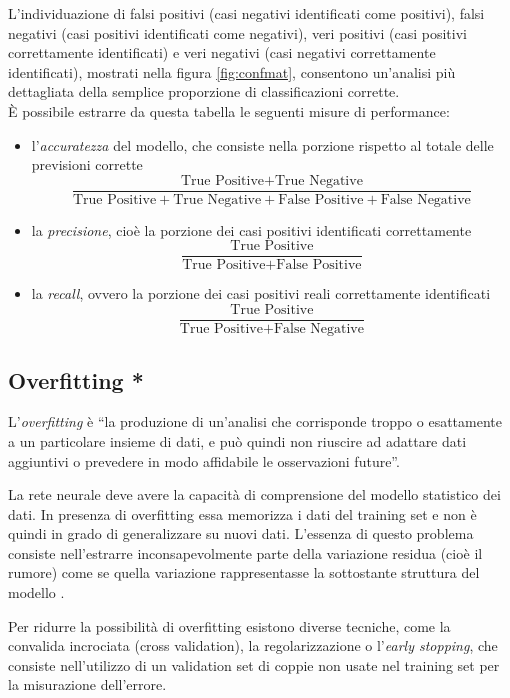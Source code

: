 L'individuazione di falsi positivi (casi negativi identificati come positivi), falsi negativi (casi positivi identificati come negativi), veri positivi (casi positivi correttamente identificati) e veri negativi (casi negativi correttamente identificati), mostrati nella figura \ref{fig:confmat}, consentono  un'analisi più dettagliata della semplice proporzione di classificazioni corrette. \\
È possibile estrarre da questa tabella le seguenti misure di performance:
\begin{itemize}
	\item l'\emph{accuratezza} del modello, che consiste nella porzione rispetto al totale delle previsioni corrette
	\begin{equation}
		\frac{\mbox{True Positive} + \mbox{True Negative}}{\mbox{True Positive} + \mbox{True Negative} + \mbox{False Positive} + \mbox{False Negative}}
	\end{equation} 
	\item la \emph{precisione}, cioè la porzione dei casi positivi identificati correttamente
		\begin{equation}
	\frac{\mbox{True Positive}}{\mbox{True Positive} + \mbox{False Positive}}
	\end{equation}
	
	\item la \emph{recall}, ovvero la porzione dei casi positivi reali correttamente identificati
		\begin{equation}
	\frac{\mbox{True Positive}}{\mbox{True Positive} + \mbox{False Negative}}
	\end{equation}
\end{itemize}


\subsection{Overfitting *}
\label{subsec:overfitting}

L'\emph{overfitting} è ``la produzione di un'analisi che corrisponde troppo o esattamente a un particolare insieme di dati, e può quindi non riuscire ad adattare dati aggiuntivi o prevedere in modo affidabile le osservazioni future''.

La rete neurale deve avere la capacità di comprensione del modello statistico dei dati. In presenza di overfitting essa memorizza i dati del training set e non è quindi in grado di generalizzare su nuovi dati. L'essenza di questo problema consiste nell'estrarre inconsapevolmente parte della variazione residua (cioè il rumore) come se quella variazione rappresentasse la sottostante struttura del modello \cite{burnham2003model}.

Per ridurre la possibilità di overfitting esistono diverse tecniche, come la convalida incrociata (cross validation), la regolarizzazione o l'\emph{early stopping}, che consiste nell'utilizzo di un validation set di coppie non usate nel training set per la misurazione dell'errore.
